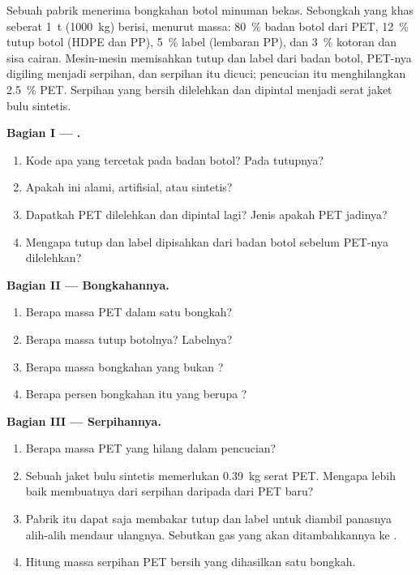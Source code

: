 \begin{problem}
\label{pb:g8:plastics:1}
Sebuah pabrik  menerima bongkahan botol minuman bekas.
Sebongkah yang khas seberat \qty{1}{t} (\qty{1000}{kg}) berisi, menurut
massa: \qty{80}{\percent} badan botol dari PET, \qty{12}{\percent} tutup
botol (HDPE dan PP), \qty{5}{\percent} label (lembaran PP), dan
\qty{3}{\percent} kotoran dan sisa cairan. Mesin-mesin memisahkan tutup
dan label dari badan botol, PET-nya digiling menjadi serpihan, dan
serpihan itu dicuci; pencucian itu menghilangkan \qty{2.5}{\percent}
PET. Serpihan yang bersih dilelehkan dan dipintal menjadi serat jaket
bulu sintetis.

\medskip
\noindent\textbf{Bagian I --- .}
\begin{enumerate}
  \item Kode apa yang tercetak pada badan botol? Pada tutupnya?
  \item Apakah  ini alami, artifisial, atau sintetis?
  \item Dapatkah PET dilelehkan dan dipintal lagi? Jenis  apakah
        PET jadinya?
  \item Mengapa tutup dan label dipisahkan dari badan botol sebelum
        PET-nya dilelehkan?
\end{enumerate}

\medskip
\noindent\textbf{Bagian II --- Bongkahannya.}
\begin{enumerate}[resume]
  \item Berapa massa PET dalam satu bongkah?
  \item Berapa massa tutup botolnya? Labelnya?
  \item Berapa massa bongkahan yang bukan ?
  \item Berapa persen bongkahan itu yang berupa ?
\end{enumerate}

\medskip
\noindent\textbf{Bagian III --- Serpihannya.}
\begin{enumerate}[resume]
  \item Berapa massa PET yang hilang dalam pencucian?
  \item Sebuah jaket bulu sintetis memerlukan \qty{0.39}{kg} serat PET.
        Mengapa lebih baik membuatnya dari serpihan daripada dari PET
        baru?
  \item Pabrik itu dapat saja membakar tutup dan label untuk diambil
        panasnya alih-alih mendaur ulangnya. Sebutkan gas yang akan
        ditambahkannya ke .
  \item Hitung massa serpihan PET bersih yang dihasilkan satu bongkah.
\end{enumerate}
\end{problem}

